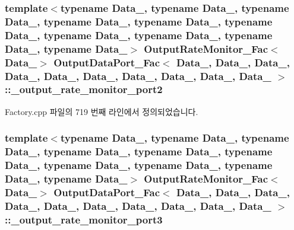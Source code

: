 \subsubsection[{\texorpdfstring{\+\_\+output\+\_\+rate\+\_\+monitor\+\_\+port2}{_output_rate_monitor_port2}}]{\setlength{\rightskip}{0pt plus 5cm}template$<$typename Data\+\_, typename Data\+\_, typename Data\+\_, typename Data\+\_, typename Data\+\_, typename Data\+\_, typename Data\+\_, typename Data\+\_, typename Data\+\_, typename Data\+\_$>$ {\bf Output\+Rate\+Monitor\+\_\+\+Fac}$<$Data\+\_$>$ {\bf Output\+Data\+Port\+\_\+\+Fac}$<$ Data\+\_, Data\+\_, Data\+\_, Data\+\_, Data\+\_, Data\+\_, Data\+\_, Data\+\_, Data\+\_, Data\+\_ $>$\+::\+\_\+output\+\_\+rate\+\_\+monitor\+\_\+port2\hspace{0.3cm}{\ttfamily [private]}}\hypertarget{classOutputDataPort__Fac_a9e9987fd7f06ad383659f5fa06ee5546}{}\label{classOutputDataPort__Fac_a9e9987fd7f06ad383659f5fa06ee5546}


Factory.\+cpp 파일의 719 번째 라인에서 정의되었습니다.

\subsubsection[{\texorpdfstring{\+\_\+output\+\_\+rate\+\_\+monitor\+\_\+port3}{_output_rate_monitor_port3}}]{\setlength{\rightskip}{0pt plus 5cm}template$<$typename Data\+\_, typename Data\+\_, typename Data\+\_, typename Data\+\_, typename Data\+\_, typename Data\+\_, typename Data\+\_, typename Data\+\_, typename Data\+\_, typename Data\+\_$>$ {\bf Output\+Rate\+Monitor\+\_\+\+Fac}$<$Data\+\_$>$ {\bf Output\+Data\+Port\+\_\+\+Fac}$<$ Data\+\_, Data\+\_, Data\+\_, Data\+\_, Data\+\_, Data\+\_, Data\+\_, Data\+\_, Data\+\_, Data\+\_ $>$\+::\+\_\+output\+\_\+rate\+\_\+monitor\+\_\+port3\hspace{0.3cm}{\ttfamily [private]}}\hypertarget{classOutputDataPort__Fac_a1abe5426f02ff8a32b09925ef4b5dce2}{}\label{classOutputDataPort__Fac_a1abe5426f02ff8a32b09925ef4b5dce2}


